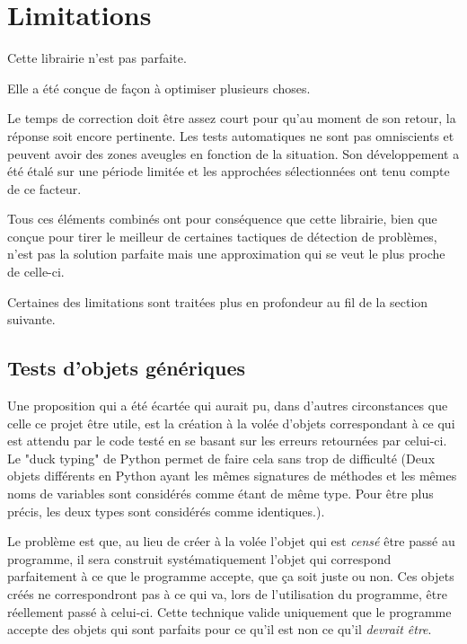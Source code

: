 \documentclass[a4paper]{report}
\begin{document}
\section{Limitations}


\begin{center}
Cette librairie n'est pas parfaite.
\end{center}

Elle a été conçue de façon à optimiser plusieurs choses.

Le temps de correction doit être assez court pour qu’au moment de son retour, la réponse soit encore pertinente.
Les tests automatiques ne sont pas omniscients et peuvent avoir des zones aveugles en fonction de la situation.
Son développement a été étalé sur une période limitée et les approchées sélectionnées ont tenu compte de ce facteur.


Tous ces éléments combinés ont pour conséquence que cette librairie, bien que conçue pour tirer le meilleur de certaines tactiques de détection de problèmes, n'est pas la solution parfaite mais une approximation qui se veut le plus proche de celle-ci.

Certaines des limitations sont traitées plus en profondeur au fil de la section suivante.


\subsection{Tests d'objets génériques}
Une proposition qui  a été écartée qui aurait pu, dans d'autres circonstances que celle ce projet être utile, est la création à la volée d'objets correspondant à ce qui est  attendu par le code testé en se basant sur les erreurs retournées par celui-ci.
Le "duck typing" de Python permet de faire cela sans trop de difficulté (Deux objets différents en Python ayant les mêmes signatures de méthodes et  les mêmes noms de variables sont considérés comme étant de même type. Pour être plus précis, les deux types sont considérés comme identiques.).

Le problème est que, au lieu de créer à la volée l'objet qui est \textit{censé} être passé au programme, il sera construit systématiquement l'objet qui correspond parfaitement à ce que le programme accepte, que ça soit juste ou non.
Ces objets créés ne correspondront pas à ce qui va, lors de l'utilisation du programme, être réellement passé à celui-ci.
Cette technique valide uniquement que le programme accepte des objets qui sont parfaits pour ce qu'il est non ce qu'il \textit{devrait être}.
\end{document}
